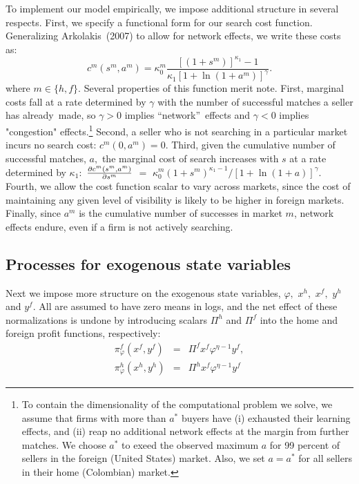 \documentclass[12pt]{article}
\begin{document}
To implement our model empirically, we impose additional structure in
several respects. First, we specify a functional form for our search cost
function. Generalizing Arkolakis\ (2007) to allow for network effects, we
write these costs as:%
\begin{equation}
c^{m}(s^{m},a^{m})=\kappa _{0}^{m}\frac{\left[ (1+s^{m})\right] ^{\kappa
_{1}}-1}{\kappa _{1}\left[ 1+\ln (1+a^{m})\right] ^{\gamma }}.
\label{cost of effort}
\end{equation}%
where $m\in \{h,f\}.$ Several properties of this function merit note. First,
marginal costs fall at a rate determined by $\gamma $ with the number of
successful matches a seller has already\ made, so $\gamma >0$ implies
\textquotedblleft network\textquotedblright\ effects and $\gamma <0$ implies
"congestion" effects.\footnote{%
To contain the dimensionality of the computational problem we solve, we
assume that firms with more than $a^{\ast }$ buyers have (i) exhausted their
learning effects, and (ii) reap no additional network effects at the margin
from further matches. We choose $a^{\ast }$ to exeed the observed maximum $a$
for 99 percent of sellers in the foreign (United States) market. Also, we
set $a=a^{\ast }$ for all sellers in their home (Colombian) market.\medskip}
Second, a seller who is not searching in a particular market incurs no
search cost: $c^{m}(0,a^{m})=0.$ Third, given the cumulative number of
successful matches, $a,$ the marginal cost of search increases with $s$ at a
rate determined by $\kappa _{1}:$ $\frac{\partial c^{m}(s^{m},a^{m})}{%
\partial s^{m}}$ $=$ $\kappa _{0}^{m}(1+s^{m})^{\kappa _{1}-1}/\left[ 1+\ln
(1+a)\right] ^{\gamma }.$ Fourth, we allow the cost function scalar to vary
across markets, since the cost of maintaining any given level of visibility
is likely to be higher in foreign markets. Finally, since $a^{m}$ is the
cumulative number of successes in market $m$, network effects endure, even
if a firm is not actively searching.

\subsection{Processes for exogenous state variables}

Next we impose more structure on the exogenous state variables, $\varphi ,$ $%
x^{h},$ $x^{f},$ $y^{h}$ and $y^{f}.$ All are assumed to have zero means in
logs, and the net effect of these normalizations is undone by introducing
scalars $\Pi ^{h}$ and $\Pi ^{f}$ into the home and foreign profit
functions, respectively:%
\begin{eqnarray}
\pi _{\varphi }^{f}(x^{f},y^{f}) &=&\Pi ^{f}x^{f}\varphi ^{\eta -1}y^{f},
\label{profit3_f} \\
\pi _{\varphi }^{h}(x^{h},y^{h}) &=&\Pi ^{h}x^{f}\varphi ^{\eta -1}y^{f}
\label{profit3_h}
\end{eqnarray}
\end{document}
